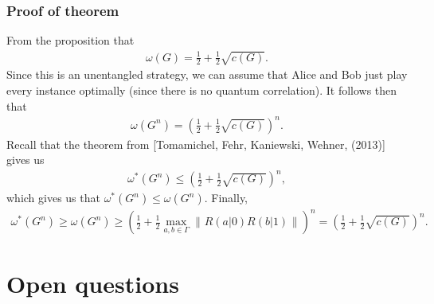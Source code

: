 \documentclass{beamer}
\newcommand{\tinyspace}{\mspace{1mu}}
\newcommand{\biggnorm}[1]{\biggl\lVert\tinyspace #1 \tinyspace\biggr\rVert}
\begin{document}
\begin{frame} 
	\frametitle{Proof of theorem}
	From the proposition that
	\begin{align*}
		\omega(G) = \frac{1}{2} + \frac{1}{2} \sqrt{c(G)}. 
	\end{align*}
	\pause
	Since this is an unentangled strategy, we can assume that Alice and Bob just play every instance optimally (since there is no quantum correlation). It follows then that
	\begin{align*}
		\omega(G^n) = \left( \frac{1}{2} + \frac{1}{2} \sqrt{c(G)} \right)^n. 
	\end{align*}
	\pause
	Recall that the theorem from [Tomamichel, Fehr, Kaniewski, Wehner, (2013)] gives us
	\begin{align*}
		\omega^*(G^n) \leq \left( \frac{1}{2} + \frac{1}{2} \sqrt{c(G)} \right)^n,
	\end{align*}
	which gives us that $\omega^*(G^n) \leq \omega(G^n)$. 
	\pause
	Finally,
	\small{
	\begin{align*}
		\omega^*(G^n) \geq \omega(G^n) \geq \left( \frac{1}{2} + \frac{1}{2} \max_{a,b \in \Gamma} \biggnorm{R(a|0)R(b|1)} \right)^n = \left( \frac{1}{2} + \frac{1}{2} \sqrt{c(G)} \right)^n.
	\end{align*}
	}
\end{frame}

  \section{Open questions}
\end{document}
